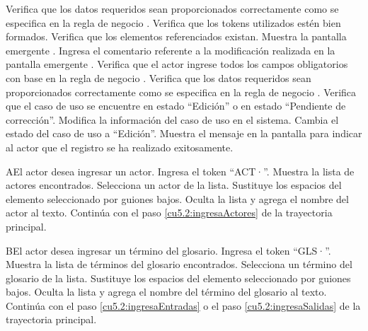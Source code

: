 \begin{UCtrayectoria}
    \UCpaso[\UCsist] Verifica que los datos requeridos sean proporcionados correctamente como se especifica en la regla de negocio .  
    \UCpaso[\UCsist] Verifica que los tokens utilizados estén bien formados. 
    \UCpaso[\UCsist] Verifica que los elementos referenciados existan. 
	\UCpaso[\UCsist] Muestra la pantalla emergente .
	\UCpaso[\UCactor] Ingresa el comentario referente a la modificación realizada en la pantalla emergente . \label{cu5.2:ingresaComentario}
    \UCpaso[\UCsist] Verifica que el actor ingrese todos los campos obligatorios con base en la regla de negocio  . 
    \UCpaso[\UCsist] Verifica que los datos requeridos sean proporcionados correctamente como se especifica en la regla de negocio . 
	\UCpaso[\UCsist] Verifica que el caso de uso se encuentre en estado ``Edición'' o en estado ``Pendiente de corrección''.
	\UCpaso[\UCsist] Modifica la información del caso de uso en el sistema.
    \UCpaso[\UCsist] Cambia el estado del caso de uso a ``Edición''.
    \UCpaso[\UCsist] Muestra el mensaje  en la pantalla  
    para indicar al actor que el registro se ha realizado exitosamente.
 \end{UCtrayectoria}
 
 \begin{UCtrayectoriaA}{A}{El actor desea ingresar un actor.}
 	\UCpaso[\UCactor] Ingresa el token ``ACT·''.
 	\UCpaso[\UCsist] Muestra la lista de actores encontrados.
 	\UCpaso[\UCactor] Selecciona un actor de la lista.
 	\UCpaso[\UCsist] Sustituye los espacios del elemento seleccionado por guiones bajos.
  	\UCpaso[\UCsist] Oculta la lista y agrega el nombre del actor al texto.
    \UCpaso[] Continúa con el paso \ref{cu5.2:ingresaActores} de la trayectoria principal.
 \end{UCtrayectoriaA}
 \begin{UCtrayectoriaA}{B}{El actor desea ingresar un término del glosario.}
 	\UCpaso[\UCactor] Ingresa el token ``GLS·''.	
 	\UCpaso[\UCsist] Muestra la lista de términos del glosario encontrados.
 	\UCpaso[\UCactor] Selecciona un término del glosario de la lista.
 	\UCpaso[\UCsist] Sustituye los espacios del elemento seleccionado por guiones bajos.
  	\UCpaso[\UCsist] Oculta la lista y agrega el nombre del término del glosario al texto.
    \UCpaso[] Continúa con el paso \ref{cu5.2:ingresaEntradas} o el paso \ref{cu5.2:ingresaSalidas} de la trayectoria principal.
 \end{UCtrayectoriaA}

